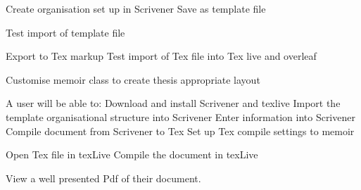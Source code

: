 \documentclass{article}
\begin{document}
Create organisation set up in Scrivener
Save as template file

Test import of template file

Export to Tex markup
Test import of Tex file into Tex live and overleaf

Customise memoir class to create thesis appropriate layout


A user will be able to:
Download and install Scrivener and texlive
Import the template organisational structure into Scrivener
Enter information into Scrivener
Compile document from Scrivener to Tex
Set up Tex compile settings to memoir

Open Tex file in texLive
Compile the document in texLive 

View a well presented Pdf of their document.
\end{document}
